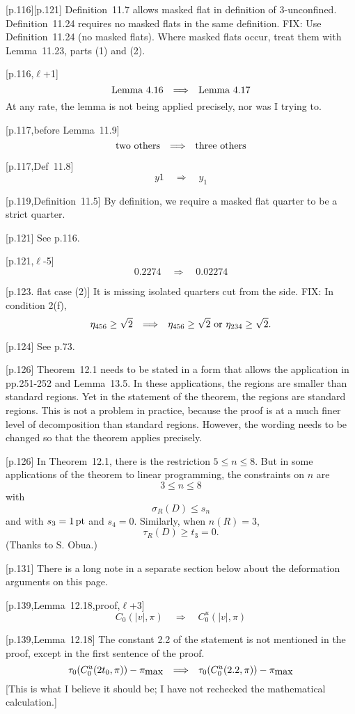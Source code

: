 \documentclass[11pt]{amsart}
\def\op#1{{\text{#1}}}
\def\to{{\quad\Longrightarrow\quad}}
\def\line{$\ell$}
\def\text{\hbox}
\begin{document}
[p.116][p.121] Definition~11.7 allows masked
flat in definition of $3$-unconfined.
Definition~11.24 requires no masked flats
in the same definition.  FIX: Use Definition~11.24 (no masked flats).  Where masked flats occur,
treat them with Lemma~11.23, parts (1) and (2).

[p.116,\line+1] 
	$$
	\text{Lemma}~4.16 \to \text{Lemma}~4.17
	$$
At any rate, the lemma is not being applied
precisely, nor was I trying to.

[p.117,before Lemma~11.9]
	$$
	\text{two others} \to \text{three others}
	$$
	
[p.117,Def~11.8]
    $$
    y1 \to y_1
    $$
    
 
[p.119,Definition~11.5]  By definition, we require a masked flat quarter to
be a strict quarter. 
	
[p.121] See p.116.

[p.121,\line-5]
	$$
	0.2274 \to 0.02274
	$$
	
[p.123. flat case (2)]  It is missing
isolated quarters cut from the side.
FIX: In condition 2(f), 
	$$
	\eta_{456}\ge\sqrt2 \to
	\eta_{456}\ge\sqrt2 \text{ or } \eta_{234}\ge\sqrt2.
	$$
	
[p.124] See p.73.
	
[p.126]  Theorem~12.1 needs to be stated in
a form that allows the application in pp.251-252
and Lemma~13.5.  In these applications, the
regions are smaller than standard regions.
Yet in the statement of the theorem, the regions
are standard regions.  This is not a problem
in practice, because the proof is at a much
finer level of decomposition than standard regions.
However, the wording needs to be changed so
that the theorem applies precisely.

[p.126] 
In Theorem~12.1, there is the restriction
	$5\le n\le 8$.
But in some applications of the theorem to
linear programming, the constraints on $n$
are   $$3\le n\le 8$$
with	$$\sigma_R(D)\le s_n$$
and with $s_3 = 1\,\op{pt}$ and $s_4=0$.
Similarly, when $n(R)=3$,
	$$\tau_R(D) \ge t_3 = 0.$$
(Thanks to S. Obua.)


[p.131] There is a long note in a separate section below about
the deformation arguments on this page.


[p.139,Lemma~12.18,proof,\line+3] 
	$$C_0(|v|,\pi) \to
	C_0^u(|v|,\pi)
	$$
	
[p.139,Lemma~12.18] The constant 2.2 of the
statement is not mentioned in the proof, except
in the first sentence of the proof.
	$$
	\tau_0(C_0^u(2t_0,\pi))-\pi_{\text{max}}\to
	\tau_0(C_0^u(2.2,\pi))-\pi_{\text{max}}
	$$
[This is what I believe it should be; I have
not rechecked the mathematical calculation.]
\end{document}
